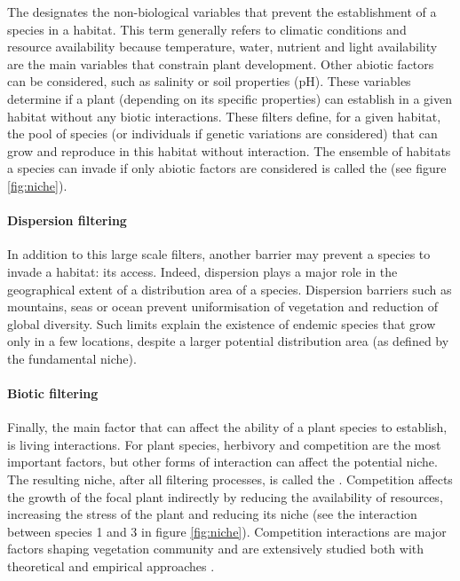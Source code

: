 The  designates the non-biological variables that prevent the establishment of a species in a habitat. This term generally refers to climatic conditions and resource availability because temperature, water, nutrient and light availability are the main variables that constrain plant development. Other abiotic factors can be considered, such as salinity \parencite{poorter_leaf_2006} or soil properties (pH). These variables determine if a plant (depending on its specific properties) can establish in a given habitat without any biotic interactions. These filters define, for a given habitat, the pool of species (or individuals if genetic variations are considered) that can grow and reproduce in this habitat without interaction. The ensemble of habitats a species can invade if only abiotic factors are considered is called the  (see figure \ref{fig:niche}). 

\paragraph{Dispersion filtering}

In addition to this large scale filters, another barrier may prevent a species to invade a habitat: its access. Indeed, dispersion plays a major role in the geographical extent of a distribution area of a species. Dispersion barriers such as mountains, seas or ocean prevent uniformisation of vegetation and reduction of global diversity. Such limits explain the existence of endemic species that grow only in a few locations, despite a larger potential distribution area (as defined by the fundamental niche).




\paragraph{Biotic filtering}

Finally, the main factor that can affect the ability of a plant species to establish, is living interactions. For plant species, herbivory and competition are the most important factors, but other forms of interaction can affect the potential niche. The resulting niche, after all filtering processes, is called the . Competition affects the growth of the focal plant indirectly by reducing the availability of resources, increasing the stress of the plant and reducing its niche (see the interaction between species 1 and 3 in figure \ref{fig:niche}). Competition interactions are major factors shaping vegetation community and are extensively studied both with theoretical \parencite{chesson_general_2000, amarasekare_competitive_2003} and empirical approaches \parencite{kunstler_plant_2016}.

